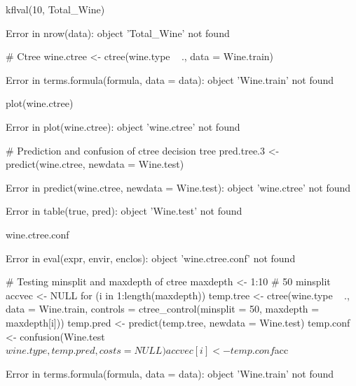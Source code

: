 \documentclass[letterpaper]{article}\usepackage[]{graphicx}\usepackage[]{color}
\begin{document}
\begin{Schunk}
\begin{Sinput}
kflval(10, Total_Wine)
\end{Sinput}
\begin{Soutput}
Error in nrow(data): object 'Total_Wine' not found
\end{Soutput}
\begin{Sinput}
# Ctree
wine.ctree <- ctree(wine.type ~ ., data = Wine.train)
\end{Sinput}
\begin{Soutput}
Error in terms.formula(formula, data = data): object 'Wine.train' not found
\end{Soutput}
\begin{Sinput}
plot(wine.ctree)
\end{Sinput}
\begin{Soutput}
Error in plot(wine.ctree): object 'wine.ctree' not found
\end{Soutput}
\begin{Sinput}
# Prediction and confusion of ctree decision tree
pred.tree.3 <- predict(wine.ctree, newdata = Wine.test)
\end{Sinput}
\begin{Soutput}
Error in predict(wine.ctree, newdata = Wine.test): object 'wine.ctree' not found
\end{Soutput}
\begin{Soutput}
Error in table(true, pred): object 'Wine.test' not found
\end{Soutput}
\begin{Sinput}
wine.ctree.conf
\end{Sinput}
\begin{Soutput}
Error in eval(expr, envir, enclos): object 'wine.ctree.conf' not found
\end{Soutput}
\begin{Sinput}
# Testing minsplit and maxdepth of ctree
maxdepth <- 1:10
# 50 minsplit
accvec <- NULL
for (i in 1:length(maxdepth)) {
    temp.tree <- ctree(wine.type ~ ., data = Wine.train, controls = ctree_control(minsplit = 50, 
        maxdepth = maxdepth[i]))
    temp.pred <- predict(temp.tree, newdata = Wine.test)
    temp.conf <- confusion(Wine.test$wine.type, temp.pred, costs = NULL)
    accvec[i] <- temp.conf$acc
}
\end{Sinput}
\begin{Soutput}
Error in terms.formula(formula, data = data): object 'Wine.train' not found

\end{Soutput}
\end{Schunk}
\end{document}
